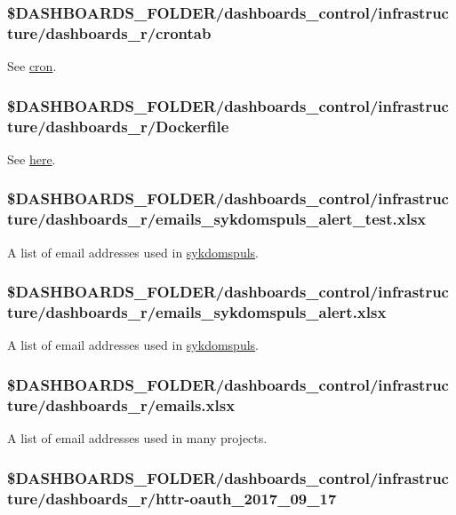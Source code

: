 \documentclass[12pt,]{article}
\begin{document}
\subsubsection{\$DASHBOARDS\_FOLDER/dashboards\_control/infrastructure/dashboards\_r/crontab}\label{dashboards_folderdashboards_controlinfrastructuredashboards_rcrontab}

See \protect\hyperlink{cron}{cron}.

\subsubsection{\$DASHBOARDS\_FOLDER/dashboards\_control/infrastructure/dashboards\_r/Dockerfile}\label{dashboards_folderdashboards_controlinfrastructuredashboards_rdockerfile}

See \protect\hyperlink{analysisdocker}{here}.

\subsubsection{\$DASHBOARDS\_FOLDER/dashboards\_control/infrastructure/dashboards\_r/emails\_sykdomspuls\_alert\_test.xlsx}\label{dashboards_folderdashboards_controlinfrastructuredashboards_remails_sykdomspuls_alert_test.xlsx}

A list of email addresses used in
\href{https://folkehelseinstituttet.github.io/dashboards_sykdomspuls/}{sykdomspuls}.

\subsubsection{\$DASHBOARDS\_FOLDER/dashboards\_control/infrastructure/dashboards\_r/emails\_sykdomspuls\_alert.xlsx}\label{dashboards_folderdashboards_controlinfrastructuredashboards_remails_sykdomspuls_alert.xlsx}

A list of email addresses used in
\href{https://folkehelseinstituttet.github.io/dashboards_sykdomspuls/}{sykdomspuls}.

\subsubsection{\$DASHBOARDS\_FOLDER/dashboards\_control/infrastructure/dashboards\_r/emails.xlsx}\label{dashboards_folderdashboards_controlinfrastructuredashboards_remails.xlsx}

A list of email addresses used in many projects.

\hypertarget{httroauth}{\subsubsection{\$DASHBOARDS\_FOLDER/dashboards\_control/infrastructure/dashboards\_r/httr-oauth\_2017\_09\_17}\label{httroauth}}
\end{document}
